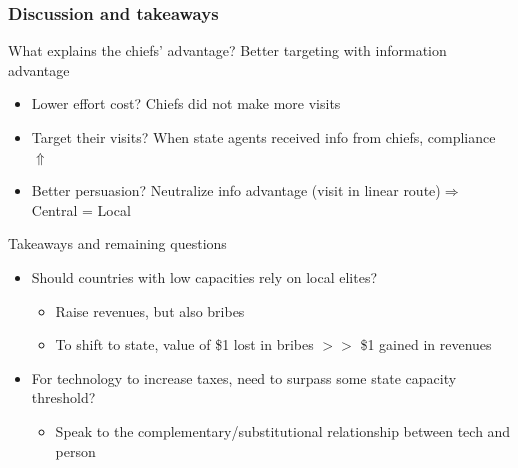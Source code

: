 \documentclass[aspectratio=169]{beamer}
\begin{document}
\begin{frame}
\frametitle{Discussion and takeaways}
What explains the chiefs' advantage? Better targeting with information advantage
\begin{itemize}\setlength\itemsep{3pt}
\item Lower effort cost? Chiefs did not make more visits
\item Target their visits? When state agents received info from chiefs, compliance $\Uparrow$
\item Better persuasion? Neutralize info advantage (visit in linear route)$\Rightarrow$ Central = Local
\end{itemize}\medskip
Takeaways and remaining questions
\begin{itemize}\setlength\itemsep{3pt}
\item Should countries with low capacities rely on local elites?
\begin{itemize}\setlength\itemsep{3pt}
\item Raise revenues, but also bribes
\item To shift to state, value of \$1 lost in bribes $>$$>$ \$1 gained in revenues
\end{itemize}
\item For technology to increase taxes, need to surpass some state capacity threshold?
\begin{itemize}\setlength\itemsep{3pt}
\item Speak to the complementary/substitutional relationship between tech and person
\end{itemize}
\end{itemize}\medskip
\end{frame}
\end{document}
